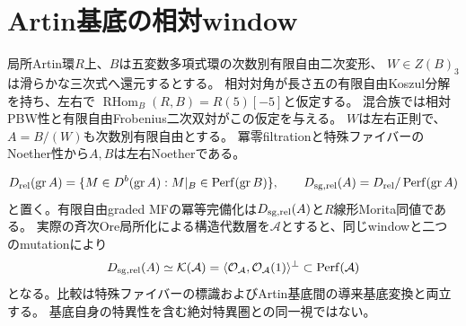 \section{Artin基底の相対window}
局所Artin環$R$上、$B$は五変数多項式環の次数別有限自由二次変形、
$W\in Z(B)_3$は滑らかな三次式へ還元するとする。
相対対角が長さ五の有限自由Koszul分解を持ち、左右で
$\operatorname{RHom}_B(R,B)=R(5)[-5]$と仮定する。
混合族では相対PBW性と有限自由Frobenius二次双対がこの仮定を与える。
$W$は左右正則で、$A=B/(W)$も次数別有限自由とする。
冪零filtrationと特殊ファイバーのNoether性から$A,B$は左右Noetherである。
\begin{theorem}\label{mix:window}
\[
 D_{\rm rel}(\operatorname{gr}A)
 =\{M\in D^b(\operatorname{gr}A):M|_B\in\operatorname{Perf}(\operatorname{gr}B)\},\qquad
 D_{\rm sg,rel}(A)=D_{\rm rel}/\operatorname{Perf}(\operatorname{gr}A)
\]
と置く。有限自由graded MFの冪等完備化は$D_{\rm sg,rel}(A)$と$R$線形Morita同値である。
実際の斉次Ore局所化による構造代数層を$\mathcal A$とすると、同じwindowと二つのmutationにより
\[
 D_{\rm sg,rel}(A)\simeq
 \mathcal K(\mathcal A)=\langle\mathcal O_{\mathcal A},\mathcal O_{\mathcal A}(1)\rangle^\perp
 \subset\operatorname{Perf}(\mathcal A)
\]
となる。比較は特殊ファイバーの標識およびArtin基底間の導来基底変換と両立する。
基底自身の特異性を含む絶対特異圏との同一視ではない。
\end{theorem}
